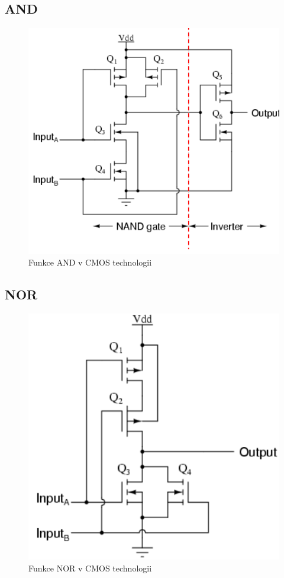 \subsection{AND}
   \begin{figure}[h]
   \begin{center}
     \includegraphics[scale=0.6]{images/ANDCMOS.png}
   \end{center}
   \caption{Funkce AND v CMOS technologii}
  \end{figure}
 \pagebreak
\subsection{NOR}
   \begin{figure}[h]
   \begin{center}
     \includegraphics[scale=0.6]{images/NORCMOS.png}
   \end{center}
   \caption{Funkce NOR v CMOS technologii}
  \end{figure}
   \pagebreak
